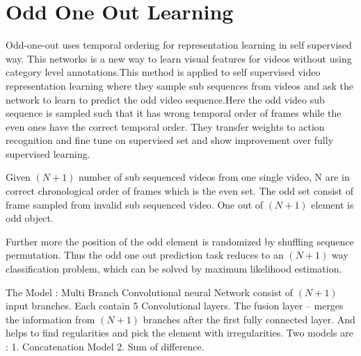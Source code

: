 \section{Odd One Out Learning}

Odd-one-out uses temporal ordering for representation learning in self supervised way.
This networks is a new way to learn visual features for videos without using category level annotations.This method is applied to self supervised video representation learning where they sample sub sequences from videos and ask the network to learn to predict the odd video sequence.Here the odd video sub sequence is sampled such that it has wrong temporal order of frames while the even ones have the correct temporal order. 
They transfer weights to action recognition and fine tune on supervised set and show improvement over fully supervised learning.

Given $(N+1)$ number of sub sequenced videos from one single video, N are in correct chronological order of frames which is the even set. The odd set consist of frame sampled from invalid sub sequenced video. One out of $(N+1)$ element is odd object.

Further more the position of the odd element is randomized by shuffling sequence permutation.
Thus the odd one out prediction task reduces to an $(N+1)$ way classification problem, which can be solved by maximum likelihood estimation. 

The Model :  Multi Branch Convolutional neural Network consist of $(N+1)$ input branches. 
Each contain 5 Convolutional layers. 
The fusion layer -- merges the information from $(N+1)$ branches after the first fully connected layer. And helps to find regularities and pick the element with irregularities. 
Two models are : 
1. Concatenation Model 
2. Sum of difference. 
